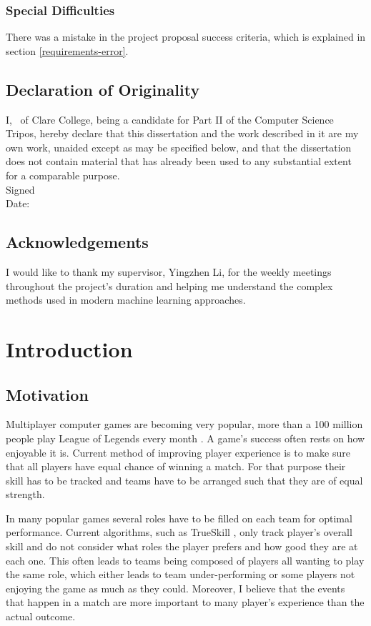 \documentclass[12pt,a4paper]{book}
\newcommand\college{Clare College}
\begin{document}
\subsection*{Special Difficulties}
There was a mistake in the project proposal success criteria, which is explained in section \ref{requirements-error}.


\section*{Declaration of Originality}
I, \@author\ of \college, being a candidate for Part II of the Computer Science Tripos, hereby declare that this dissertation and the work described in it are my own work, unaided except as may be specified below, and that the dissertation does not contain material that has already been used to any substantial extent for a comparable purpose. %
\\[1\baselineskip]
\noindent Signed 
\\[1\baselineskip]
\noindent Date: \thedate

\section*{Acknowledgements}
I would like to thank my supervisor, Yingzhen Li, for the weekly meetings throughout the project's duration and helping me understand the complex methods used in modern machine learning approaches.

\clearpage
\tableofcontents
\listoffigures

\mainmatter
\chapter{Introduction}
\section{Motivation}
Multiplayer computer games are becoming very popular, more than a 100 million people play League of Legends every month \cite{league100}.
A game's success often rests on how enjoyable it is.
Current method of improving player experience is to make sure that all players have equal chance of winning a match.
For that purpose their skill has to be tracked and teams have to be arranged such that they are of equal strength.

In many popular games several roles have to be filled on each team for optimal performance.
Current algorithms, such as TrueSkill \cite{trueskill}, only track player's overall skill and do not consider what roles the player prefers and how good they are at each one.
This often leads to teams being composed of players all wanting to play the same role, which either leads to team under-performing or some players not enjoying the game as much as they could.
Moreover, I believe that the events that happen in a match are more important to many player's experience than the actual outcome.
\end{document}
